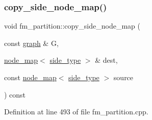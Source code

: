 \mbox{\label{classfm__partition_a33d1dbba0ce9e398adab753f403deac3}} 
\subsubsection{\texorpdfstring{copy\+\_\+side\+\_\+node\+\_\+map()}{copy\_side\_node\_map()}}
{\footnotesize\ttfamily void fm\+\_\+partition\+::copy\+\_\+side\+\_\+node\+\_\+map (\begin{DoxyParamCaption}\item[{const \mbox{\hyperlink{classgraph}{graph}} \&}]{G,  }\item[{\mbox{\hyperlink{classnode__map}{node\+\_\+map}}$<$ \mbox{\hyperlink{classfm__partition_a7cdff1bea3740a287387e8408e16ca79}{side\+\_\+type}} $>$ \&}]{dest,  }\item[{const \mbox{\hyperlink{classnode__map}{node\+\_\+map}}$<$ \mbox{\hyperlink{classfm__partition_a7cdff1bea3740a287387e8408e16ca79}{side\+\_\+type}} $>$}]{source }\end{DoxyParamCaption}) const\hspace{0.3cm}{\ttfamily [protected]}}



Definition at line 493 of file fm\+\_\+partition.\+cpp.


